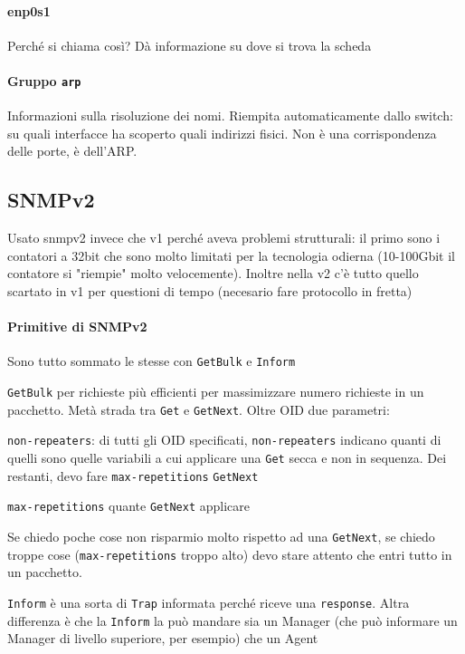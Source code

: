 \documentclass[10pt]{book}
\begin{document}
\paragraph{enp0s1} Perché si chiama così? Dà informazione su dove si trova la scheda
\paragraph{Gruppo \texttt{arp}} Informazioni sulla risoluzione dei nomi. Riempita automaticamente dallo switch: su quali interfacce ha scoperto quali indirizzi fisici. Non è una corrispondenza delle porte, è dell'ARP.
\subsection{SNMPv2}
Usato snmpv2 invece che v1 perché aveva problemi strutturali: il primo sono i contatori a 32bit che sono molto limitati per la tecnologia odierna (10-100Gbit il contatore si "riempie" molto velocemente). Inoltre nella v2 c'è tutto quello scartato in v1 per questioni di tempo (necesario fare protocollo in fretta)
\paragraph{Primitive di SNMPv2} Sono tutto sommato le stesse con \texttt{GetBulk} e \texttt{Inform}
\begin{list}{}{}
	\item \texttt{GetBulk} per richieste più efficienti per massimizzare numero richieste in un pacchetto. Metà strada tra \texttt{Get} e \texttt{GetNext}. Oltre OID due parametri:
	\begin{list}{}{}
		\item \texttt{non-repeaters}: di tutti gli OID specificati, \texttt{non-repeaters} indicano quanti di quelli sono quelle variabili a cui applicare una \texttt{Get} secca e non in sequenza. Dei restanti, devo fare \texttt{max-repetitions} \texttt{GetNext}
		\item \texttt{max-repetitions} quante \texttt{GetNext} applicare
	\end{list}
	Se chiedo poche cose non risparmio molto rispetto ad una \texttt{GetNext}, se chiedo troppe cose (\texttt{max-repetitions} troppo alto) devo stare attento che entri tutto in un pacchetto.
	\item \texttt{Inform} è una sorta di \texttt{Trap} informata perché riceve una \texttt{response}. Altra differenza è che la \texttt{Inform} la può mandare sia un Manager (che può informare un Manager di livello superiore, per esempio) che un Agent
\end{list}
\end{document}
